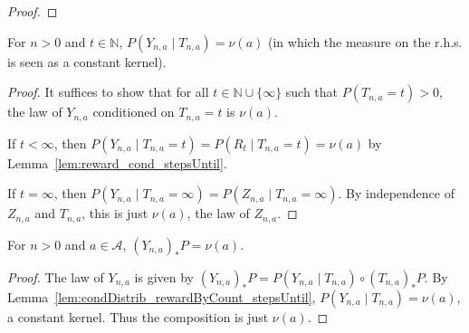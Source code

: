 \begin{proof}\leanok

\end{proof}


\begin{lemma}\label{lem:condDistrib_rewardByCount_stepsUntil}
\leanok
For $n > 0$ and $t \in \mathbb{N}$, $P(Y_{n,a} \mid T_{n,a}) = \nu(a)$ (in which the measure on the r.h.s. is seen as a constant kernel).
\end{lemma}

\begin{proof}\leanok
It suffices to show that for all $t \in \mathbb{N} \cup \{\infty\}$ such that $P(T_{n, a} = t) > 0$, the law of $Y_{n,a}$ conditioned on $T_{n,a} = t$ is $\nu(a)$.

If $t < \infty$, then $P(Y_{n, a} \mid T_{n, a} = t) = P(R_t \mid T_{n, a} = t) = \nu(a)$ by Lemma~\ref{lem:reward_cond_stepsUntil}.

If $t = \infty$, then $P(Y_{n, a} \mid T_{n, a} = \infty) = P(Z_{n, a} \mid T_{n, a} = \infty)$. By independence of $Z_{n,a}$ and $T_{n, a}$, this is just $\nu(a)$, the law of $Z_{n,a}$.
\end{proof}


\begin{lemma}\label{lem:hasLaw_rewardByCount}
  \leanok
For $n > 0$ and $a \in \mathcal{A}$, $(Y_{n,a})_*P = \nu(a)$.
\end{lemma}

\begin{proof}\leanok
The law of $Y_{n,a}$ is given by $(Y_{n, a})_*P = P(Y_{n, a} \mid T_{n, a}) \circ (T_{n, a})_*P$.
By Lemma~\ref{lem:condDistrib_rewardByCount_stepsUntil}, $P(Y_{n, a} \mid T_{n, a}) = \nu(a)$, a constant kernel.
Thus the composition is just $\nu(a)$.
\end{proof}



